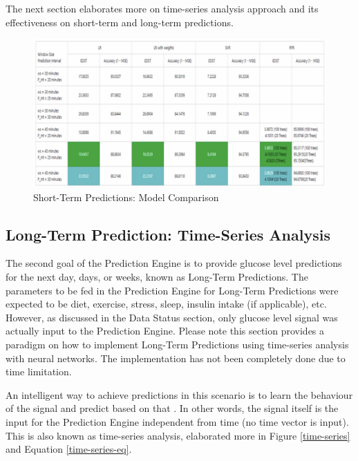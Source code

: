 The next section elaborates more on time-series analysis approach and its effectiveness on short-term and long-term predictions.

\begin{center}
\begin{figure}[ht!]
	\centering
    \includegraphics[width=\textwidth]{Figures/mo/cmp-models.png}
 	\caption{Short-Term Predictions: Model Comparison}
  	\label{cmp-fig}
\end{figure}
\end{center}

\subsection{Long-Term Prediction: Time-Series Analysis}

The second goal of the Prediction Engine is to provide glucose level predictions for the next day, days, or weeks, known as Long-Term Predictions. The parameters to be fed in the Prediction Engine for Long-Term Predictions were expected to be diet, exercise, stress, sleep, insulin intake (if applicable), etc. However, as discussed in the Data Status section, only glucose level signal was actually input to the Prediction Engine. 
Please note this section provides a paradigm on how to implement Long-Term Predictions using time-series analysis with neural networks. The implementation has not been completely done due to time limitation. 

An intelligent way to achieve predictions in this scenario is to learn the behaviour of the signal and predict based on that \cite{time-series-paper}. In other words, the signal itself is the input for the Prediction Engine independent from time (no time vector is input). This is also known as time-series analysis, elaborated more in Figure \ref{time-series} and Equation \ref{time-series-eq}. 

